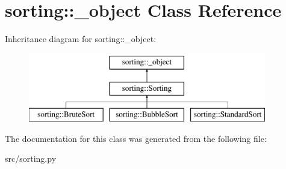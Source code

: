 \hypertarget{classsorting_1_1__object}{
\section{sorting::\_\-object Class Reference}
\label{da/d16/classsorting_1_1__object}
}
Inheritance diagram for sorting::\_\-object:\begin{figure}[H]
\begin{center}
\leavevmode
\includegraphics[height=3cm]{da/d16/classsorting_1_1__object}
\end{center}
\end{figure}


The documentation for this class was generated from the following file:\begin{DoxyCompactItemize}
\item 
src/sorting.py\end{DoxyCompactItemize}
